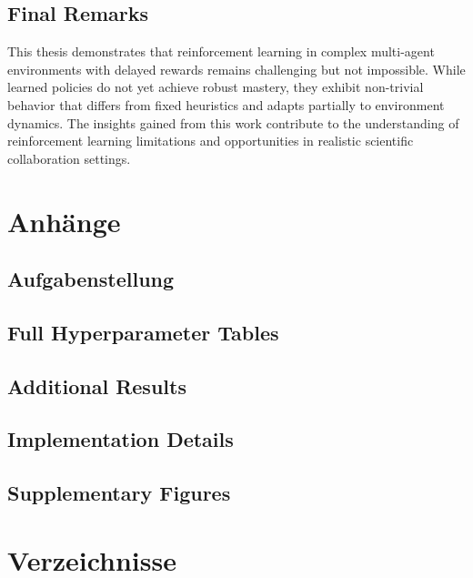 \documentclass[english,bachelor]{hsluthesis}
\begin{document}
\section{Final Remarks}

This thesis demonstrates that reinforcement learning in complex multi-agent environments with delayed rewards remains challenging but not impossible. While learned policies do not yet achieve robust mastery, they exhibit non-trivial behavior that differs from fixed heuristics and adapts partially to environment dynamics. The insights gained from this work contribute to the understanding of reinforcement learning limitations and opportunities in realistic scientific collaboration settings.



\footnotesize



\appendix

\chapter{Anhänge}

\section{Aufgabenstellung}

\section{Full Hyperparameter Tables}

\section{Additional Results}

\section{Implementation Details}

\section{Supplementary Figures}

\chapter{Verzeichnisse}

\glsaddallunused                                %
\end{document}
